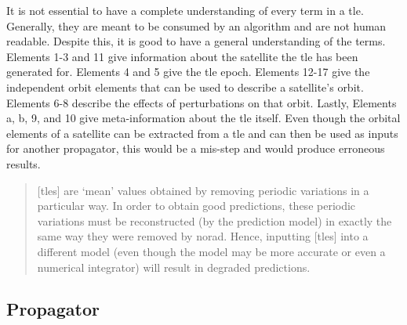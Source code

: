 It is not essential to have a complete understanding of every term in a
\gls{tle}. Generally, they are meant to be consumed by an algorithm and are not
human readable. Despite this, it is good to have a general understanding of the
terms.  Elements 1-3 and 11 give information about the satellite the \gls{tle}
has been generated for. Elements 4 and 5 give the \gls{tle} epoch.  Elements
12-17 give the independent orbit elements that can be used to describe a
satellite's orbit. Elements 6-8 describe the effects of perturbations on that
orbit. Lastly, Elements a, b, 9, and 10 give meta-information about the
\gls{tle} itself. Even though the orbital elements of a satellite can be
extracted from a \gls{tle} and can then be used as inputs for another
propagator, this would be a mis-step and would produce erroneous results. 

\begin{quote}
[\glspl{tle}] are `mean' values obtained by removing
periodic variations in a particular way. In order to obtain good predictions,
these periodic variations must be reconstructed (by the prediction model) in
exactly the same way they were removed by \gls{norad}. Hence, inputting
[\glspl{tle}] into a different model (even though the model may be more accurate or even
a numerical integrator) will result in degraded predictions. \cite{hoots_spacetrack_1980}
\end{quote}


\subsection{Propagator}

